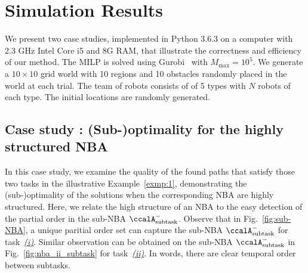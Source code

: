 \documentclass[Afour,sageh,times]{sagej}
\newcommand{\auto}[1]{\ccalA_{\textup{#1}}}
\newcommand{\RNum}[1]{\uppercase\expandafter{\romannumeral #1\relax}}
\begin{document}
{ %
\section{Simulation Results}\label{sec:sim}
We present two case studies, implemented in Python 3.6.3 on a computer with 2.3 GHz Intel Core i5 and 8G RAM, that illustrate the correctness and efficiency of our method. The MILP is solved using Gurobi~\citep{gurobi} with $M_{\text{max}}=10^5$. We generate a  $10\times 10$ grid world with 10 regions and 10 obstacles randomly placed in the world at each trial. The team of robots consists of of 5 types with $N$ robots of each type. The initial locations are randomly generated.

\subsection{Case study \RNum{1}: (Sub-)optimality for the highly structured NBA}
In this case study, we examine the quality of the found paths that satisfy those two tasks in the illustrative Example~\ref{exmp:1}, demonstrating the (sub-)optimality of the solutions when the corresponding NBA are highly structured. Here, we relate the high structure of an NBA to the easy detection of the  partial order in the sub-NBA $\auto{subtask}^-$. Observe that in Fig.~\ref{fig:sub-NBA}, a unique paritial order set can capture the sub-NBA $\auto{subtask}^-$ for task~\hyperref[task:i]{\it (i)}. Similar observation can be obtained  on the sub-NBA $\auto{subtask}^-$ in Fig.~\ref{fig:nba_ii_subtask} for task~\hyperref[task:ii]{\it (ii)}. In words, there are clear temporal order between subtasks.

}
\end{document}
